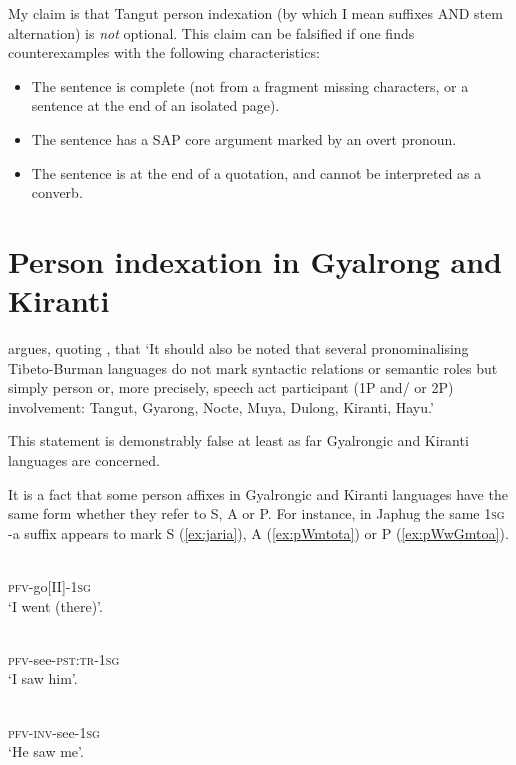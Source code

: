 \documentclass[oldfontcommands,oneside,a4paper,11pt]{article}
\newcommand{\ipa}[1]{{\phon \mbox{#1}}} %
\begin{document}
My claim is that Tangut person indexation (by which I mean suffixes AND stem alternation) is \textit{not} optional. This claim can be falsified if one finds counterexamples with the following characteristics:

\begin{itemize}
\item The sentence is complete (not from a fragment missing characters, or a sentence at the end of an isolated page).
\item The sentence has a SAP core argument marked by an overt pronoun.
\item The sentence is at the end of a quotation, and cannot be interpreted as a converb.
\end{itemize}

\section{Person indexation in Gyalrong and Kiranti} \label{sec:rgyalrong}
\citet[53]{zeisler15eat} argues, quoting \citet[308]{lapolla92}, that `It should also be noted that several pronominalising Tibeto-Burman languages do not mark syntactic relations or semantic roles but simply person or, more precisely, speech act participant (1P and/ or 2P) involvement: Tangut, Gyarong, Nocte, Muya, Dulong, Kiranti, Hayu.'

This statement is demonstrably false at least as far Gyalrongic and Kiranti languages are concerned.  

It is a fact that some person affixes in Gyalrongic and Kiranti languages have the same form whether they refer to S, A or P. For instance, in Japhug the same \textsc{1sg} \ipa{-a} suffix appears to mark S (\ref{ex:jaria}), A (\ref{ex:pWmtota}) or P (\ref{ex:pWwGmtoa}).

\begin{exe}
\ex \label{ex:jaria}
\gll \ipa{jɤ-ari-a} \\
\textsc{pfv}-go[II]-\textsc{1sg} \\
\glt `I went (there)'.
\end{exe}

\begin{exe}
\ex \label{ex:pWmtota}
\gll \ipa{pɯ-mto-t-a} \\
\textsc{pfv}-see-\textsc{pst:tr}-\textsc{1sg} \\
\glt `I saw him'.
\end{exe}


\begin{exe}
\ex \label{ex:pWwGmtoa}
\gll \ipa{pɯ́-wɣ-mto-a} \\
\textsc{pfv}-\textsc{inv}-see-\textsc{1sg} \\
\glt `He saw me'.
\end{exe}
\end{document}
